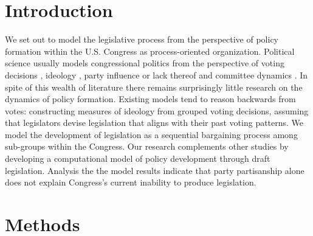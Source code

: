 \documentclass[pdftex,12pt]{llncs}
\begin{document}
\section{Introduction}
%
%
%
%
We set out to model the legislative process from the perspective of policy formation within the U.S. Congress as process-oriented organization. 
Political science usually models congressional politics from the perspective of voting decisions \parencite{m74, k89}, ideology \parencite{pr97}, party influence \parencite{cm93,cm05,a95} or lack thereof \parencite{k91, k98} and committee dynamics \parencite{sw87, gk89, m04}. 
In spite of this wealth of literature there remains surprisingly little research on the dynamics of policy formation. 
Existing models tend to reason backwards from votes: constructing measures of ideology from grouped voting decisions, assuming that legislators devise legislation that aligns with their past voting patterns.   
We model the development of legislation as a sequential bargaining process among sub-groups within the Congress. 
Our research complements other studies by developing a computational model of policy development through draft legislation.
Analysis the the model results indicate that party partisanship alone does not explain Congress's current inability to produce legislation.  


\section{Methods}
%
%
\end{document}
